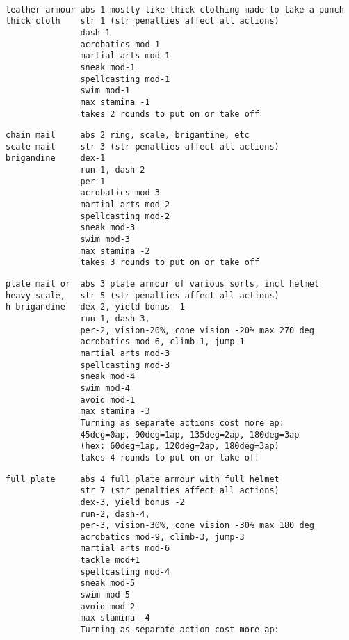 \

\goodbreak \small \begin{samepage} \begin{verbatim}
leather armour abs 1 mostly like thick clothing made to take a punch
thick cloth    str 1 (str penalties affect all actions)
               dash-1
               acrobatics mod-1
               martial arts mod-1
               sneak mod-1
               spellcasting mod-1
               swim mod-1
               max stamina -1
               takes 2 rounds to put on or take off
\end{verbatim} \blocklistgap \begin{verbatim}
chain mail     abs 2 ring, scale, brigantine, etc
scale mail     str 3 (str penalties affect all actions)
brigandine     dex-1
               run-1, dash-2
               per-1
               acrobatics mod-3
               martial arts mod-2
               spellcasting mod-2
               sneak mod-3
               swim mod-3
               max stamina -2
               takes 3 rounds to put on or take off
\end{verbatim} \blocklistgap \begin{verbatim}
plate mail or  abs 3 plate armour of various sorts, incl helmet
heavy scale,   str 5 (str penalties affect all actions)
h brigandine   dex-2, yield bonus -1
               run-1, dash-3,
               per-2, vision-20%, cone vision -20% max 270 deg
               acrobatics mod-6, climb-1, jump-1
               martial arts mod-3
               spellcasting mod-3
               sneak mod-4
               swim mod-4
               avoid mod-1
               max stamina -3
               Turning as separate actions cost more ap:
               45deg=0ap, 90deg=1ap, 135deg=2ap, 180deg=3ap
               (hex: 60deg=1ap, 120deg=2ap, 180deg=3ap)
               takes 4 rounds to put on or take off
\end{verbatim} \blocklistgap \begin{verbatim}
full plate     abs 4 full plate armour with full helmet
               str 7 (str penalties affect all actions)
               dex-3, yield bonus -2
               run-2, dash-4,
               per-3, vision-30%, cone vision -30% max 180 deg
               acrobatics mod-9, climb-3, jump-3
               martial arts mod-6
               tackle mod+1
               spellcasting mod-4
               sneak mod-5
               swim mod-5
               avoid mod-2
               max stamina -4
               Turning as separate action cost more ap:

\end{verbatim}
\end{samepage}
